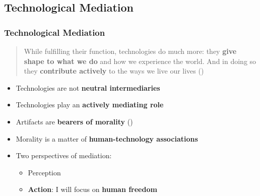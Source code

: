 \documentclass{beamer}
\begin{document}
\subsection{Technological Mediation}
\begin{frame}
\frametitle{Technological Mediation}
\begin{quote}While fulfilling their function, technologies do much more: they \textbf{give shape to what we do} and how we experience the world. 
	And in doing so they \textbf{contribute actively} to the ways we live our lives (\cite{verbeek2011moralizing})
\end{quote}

\begin{itemize}
	\item Technologies are not \textbf{neutral intermediaries}
	\item Technologies play an \textbf{actively mediating role} 
	\item Artifacts are \textbf{bearers of morality} (\cite{latour1992})
	\item Morality is a matter
of \textbf{human-technology associations}

\begin{comment}
in terms of a radical separation of a human moral agent, on the one hand,
acting in a world of mute material objects on the other. 

\end{comment}
\end{itemize}

\begin{itemize}
	\item Two perspectives of mediation:
	\begin{itemize}
		\item Perception
		\item \textbf{Action}: %
		I will focus on \textbf{human freedom}
	\end{itemize}
\end{itemize}
\end{frame}
\end{document}
